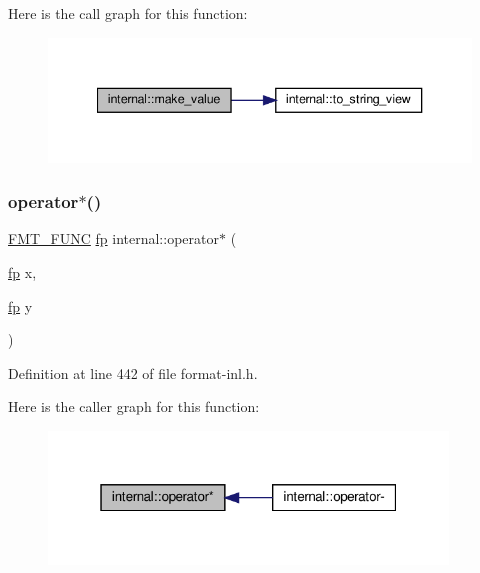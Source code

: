 Here is the call graph for this function\+:
\nopagebreak
\begin{figure}[H]
\begin{center}
\leavevmode
\includegraphics[width=340pt]{namespaceinternal_a3762125b750d86d353134984d7049419_cgraph}
\end{center}
\end{figure}
\mbox{\label{namespaceinternal_a2142ade7c615c7cd113144896aed15c8}} 
\subsubsection{\texorpdfstring{operator$\ast$()}{operator*()}}
{\footnotesize\ttfamily \hyperlink{format_8h_a02c8898388e0ae59aab58be14fcd4e05}{F\+M\+T\+\_\+\+F\+U\+NC} \hyperlink{classinternal_1_1fp}{fp} internal\+::operator$\ast$ (\begin{DoxyParamCaption}\item[{\hyperlink{classinternal_1_1fp}{fp}}]{x,  }\item[{\hyperlink{classinternal_1_1fp}{fp}}]{y }\end{DoxyParamCaption})}



Definition at line 442 of file format-\/inl.\+h.

Here is the caller graph for this function\+:
\nopagebreak
\begin{figure}[H]
\begin{center}
\leavevmode
\includegraphics[width=301pt]{namespaceinternal_a2142ade7c615c7cd113144896aed15c8_icgraph}
\end{center}
\end{figure}
\mbox{\label{namespaceinternal_a7e865636bf5c10d44d1dfb4d9ec22c79}} 
